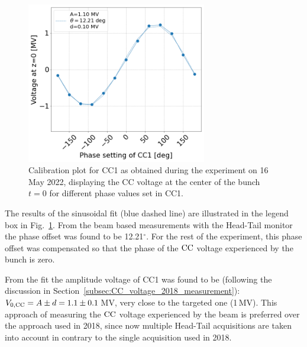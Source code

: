 

\begin{figure}[!h] %
   \centering         
   \includegraphics[width=0.7\textwidth]{images/Ch8/Vcc_at_z_zero_vs_inspector_phase_CC1_for_thesis_new_xlabel_may22.png}
       \caption{Calibration plot for CC1 as obtained during the experiment on 16 May 2022, displaying the CC voltage at the center of the bunch $t=0$ for different phase values set in CC1.}
       \label{fig:Vcc_calibration_md_2022}
\end{figure}

The results of the sinusoidal fit (blue dashed line) are illustrated in the legend box in Fig.~\ref{fig:Vcc_calibration_md_2022}. From the beam based measurements with the Head-Tail monitor the phase offset was found to be 12.21$^\circ$. For the rest of the experiment, this phase offset was compensated so that the phase of the ${\mathrm{CC}}$ voltage experienced by the bunch is zero. 


From the fit the amplitude voltage of CC1 was found to be (following the discussion in Section~\ref{subsec:CC_voltage_2018_measurement}): ${V_\mathrm{0, CC}}=A \pm d = 1.1 \pm 0.1$\,MV, very close to the targeted one (1\,MV). This approach of measuring the ${\mathrm{CC}}$ voltage experienced by the beam is preferred over the approach used in 2018, since now multiple Head-Tail acquisitions are taken into account in contrary to the single acquisition used in 2018.  



